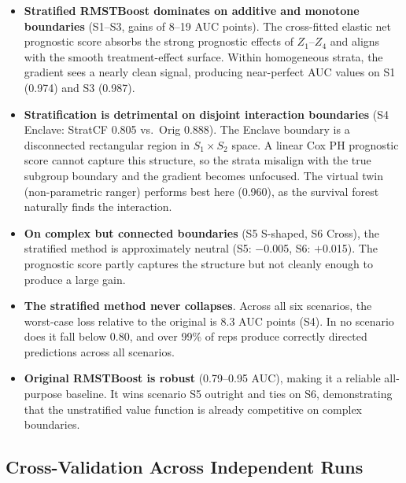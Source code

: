 \documentclass[11pt,letterpaper]{article}
\begin{document}
\begin{itemize}
  \item \textbf{Stratified RMSTBoost dominates on additive and monotone
        boundaries} (S1--S3, gains of 8--19 AUC points).  The cross-fitted
        elastic net prognostic score absorbs the strong prognostic effects
        of $Z_1$--$Z_4$ and aligns with the smooth treatment-effect
        surface.  Within homogeneous strata, the gradient sees a nearly
        clean signal, producing near-perfect AUC values on S1 (0.974) and S3 (0.987).

  \item \textbf{Stratification is detrimental on disjoint interaction
        boundaries} (S4 Enclave: StratCF 0.805 vs.\ Orig 0.888).  The
        Enclave boundary is a disconnected rectangular region in
        $S_1 \times S_2$ space.  A linear Cox PH prognostic score cannot
        capture this structure, so the strata misalign with the true
        subgroup boundary and the gradient becomes unfocused.  The virtual
        twin (non-parametric ranger) performs best here (0.960), as the
        survival forest naturally finds the interaction.

  \item \textbf{On complex but connected boundaries} (S5 S-shaped, S6
        Cross), the stratified method is approximately neutral (S5: $-$0.005,
        S6: $+$0.015).  The prognostic score partly captures the structure
        but not cleanly enough to produce a large gain.

  \item \textbf{The stratified method never collapses}.  Across all six
        scenarios, the worst-case loss relative to the original is 8.3 AUC points (S4).  In no scenario does it fall below 0.80, and over 99\% of reps produce correctly directed predictions across all scenarios.

  \item \textbf{Original RMSTBoost is robust} (0.79--0.95 AUC), making it a
        reliable all-purpose baseline.  It wins scenario S5 outright and
        ties on S6, demonstrating that the unstratified value function is
        already competitive on complex boundaries.
\end{itemize}

\subsection{Cross-Validation Across Independent Runs}
\end{document}

